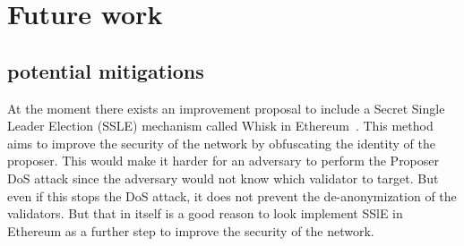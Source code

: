 

\section{Future work}\label{sec:future-works}

\subsection{potential mitigations}\label{subsec:potential-mitigations}
At the moment there exists an improvement proposal to include a Secret Single Leader Election (SSLE) mechanism called Whisk in Ethereum~\cite{EthereumResearchSSLE2024}.
This method aims to improve the security of the network by obfuscating the identity of the proposer.
This would make it harder for an adversary to perform the Proposer DoS attack since the adversary would not know which validator to target.
But even if this stops the DoS attack, it does not prevent the de-anonymization of the validators.
But that in itself is a good reason to look implement SSlE in Ethereum as a further step to improve the security of the network.
